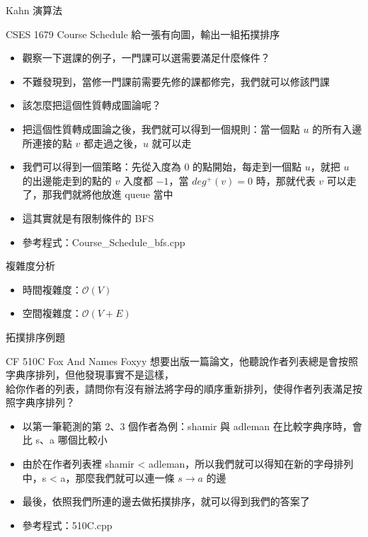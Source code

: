 \documentclass[aspectratio=169]{beamer}
\begin{document}
    \begin{frame}{Kahn 演算法}
        \begin{block}{CSES 1679 Course Schedule}
            給一張有向圖，輸出一組拓撲排序
        \end{block}
        
        \begin{itemize}
            \item<1-> 觀察一下選課的例子，一門課可以選需要滿足什麼條件？
            \item<2-> 不難發現到，當修一門課前需要先修的課都修完，我們就可以修該門課
            \item<3-> 該怎麼把這個性質轉成圖論呢？
            \item<3-> 把這個性質轉成圖論之後，我們就可以得到一個規則：當一個點 $u$ 的所有入邊所連接的點 $v$ 都走過之後，$u$ 就可以走
            \item<4-> 我們可以得到一個策略：先從入度為 0 的點開始，每走到一個點 $u$，就把 $u$ 的出邊能走到的點的 $v$ 入度都 $-1$，當 $deg^+(v)=0$ 時，那就代表 $v$ 可以走了，那我們就將他放進 queue 當中
            \item<5-> 這其實就是有限制條件的 BFS
            \item<5-> 參考程式：Course\_Schedule\_bfs.cpp
        \end{itemize}
    \end{frame}

    \begin{frame}{複雜度分析}
        \begin{itemize}
            \item 時間複雜度：$\mathcal{O}(V)$
            \item 空間複雜度：$\mathcal{O}(V+E)$
        \end{itemize}
    \end{frame}

    \begin{frame}{拓撲排序例題}
        \begin{block}{CF 510C Fox And Names}
            Foxyy 想要出版一篇論文，他聽說作者列表總是會按照字典序排列，但他發現事實不是這樣，\\
            給你作者的列表，請問你有沒有辦法將字母的順序重新排列，使得作者列表滿足按照字典序排列？
        \end{block}

        \begin{itemize}
            \item<2-> 以第一筆範測的第 2、3 個作者為例：shamir 與 adleman 在比較字典序時，會比 s、a 哪個比較小
            \item<3-> 由於在作者列表裡 shamir < adleman，所以我們就可以得知在新的字母排列中，s < a，那麼我們就可以連一條 $s \rightarrow a$ 的邊
            \item<4-> 最後，依照我們所連的邊去做拓撲排序，就可以得到我們的答案了
            \item<4-> 參考程式：510C.cpp
        \end{itemize}
    \end{frame}
\end{document}
